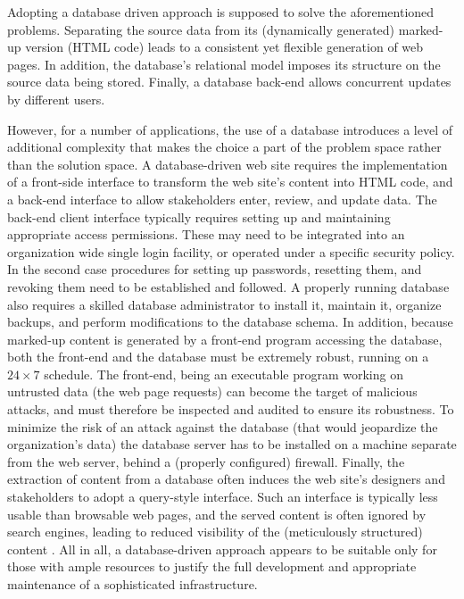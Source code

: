 \documentclass[10pt]{article}
\begin{document}
Adopting a database driven approach is supposed to
solve the aforementioned problems.
Separating the source data from its (dynamically generated)
marked-up version ({\sc HTML} code) leads to a consistent
yet flexible generation of web pages.
In addition, the database's relational model imposes
its structure on the source data being stored.
Finally, a database back-end allows concurrent updates by
different users.

However, for a number of applications, the use of a database
introduces a level of additional complexity that
makes the choice a part of
the problem space rather than the solution space.
A database-driven web site requires the implementation of a
front-side interface to transform the web site's content into
{\sc HTML} code, and a back-end interface to allow stakeholders
enter, review, and update data.
The back-end client interface typically requires setting up
and maintaining appropriate access permissions.
These may need to be integrated into an organization wide single
login facility, or operated under a specific security policy.
In the second case procedures for setting up passwords,
resetting them, and revoking them need to be established and followed.
A properly running database also requires a skilled database
administrator to install it, maintain it, organize backups,
and perform modifications to the database schema.
In addition, because marked-up content is generated by a front-end
program accessing the database, both the front-end and the database
must be extremely robust, running on a $24 \times 7$ schedule.
The front-end, being an executable program working on
untrusted data (the web page requests) can become the target of
malicious attacks,
and must therefore be inspected and audited to ensure its robustness.
To minimize the risk of an attack against the database
(that would jeopardize the organization's data)
the database server has to be installed on a machine separate
from the web server, behind a (properly configured) firewall.
Finally, the extraction of content from a database often
induces the web site's designers and stakeholders to adopt a
query-style interface.
Such an interface is typically less usable than browsable web pages,
and the served content is often ignored by search engines,
leading to reduced visibility
of the (meticulously structured) content \cite{DEEP_WEB} \cite{JP04}.
All in all, a database-driven approach appears to be suitable
only for those with ample resources to justify the full
development and appropriate maintenance of a sophisticated infrastructure.
\end{document}

